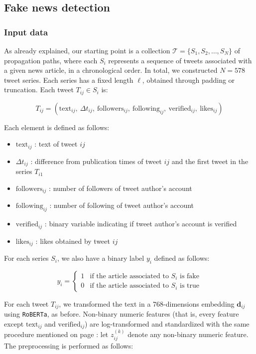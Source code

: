\documentclass[a4paper,twoside,12pt]{book}
\begin{document}
\subsection{Fake news detection} \label{fakenewsdata_detection_models}
\subsubsection*{Input data}

As already explained, our starting point is a collection $\mathcal{T} = \{ S_1, S_2, \dots, S_N \}$ of propagation paths, where each $S_i$ represents a sequence of tweets associated with a given news article, in a chronological order. In total, we constructed $N = 578$ tweet series. Each series has a fixed length $\ell$, obtained through padding or truncation.
Each tweet $T_{ij} \in S_i$ is: 

$$
T_{ij} = \left( \text{text}_{ij},\ \Delta t_{ij},\ \text{followers}_{ij},\ \text{following}_{ij},\ \text{verified}_{ij},\ \text{likes}_{ij} \right)
$$

Each element is defined as follows:
\begin{itemize}
	\item $\text{text}_{ij}$ : text of tweet $ij$
	\item $\Delta t_{ij}$ : difference from publication times of tweet $ij$ and the first tweet in the series $T_{i1}$
	\item $\text{followers}_{ij}$ : number of followers of tweet author's account
	\item $\text{following}_{ij}$ : number of following of tweet author's account
	\item $\text{verified}_{ij}$ : binary variable indicating if tweet author's account is verified
	\item $\text{likes}_{ij}$ : likes obtained by tweet $ij$
\end{itemize}

For each series $S_i$, we also have a binary label $y_i$ defined as follows:

$$
y_i =
\begin{cases}
	1 & \text{if the article associated to } S_i \text{ is fake} \\
	0 & \text{if the article associated to } S_i \text{ is true}
\end{cases}
$$

For each tweet $T_{ij}$, we transformed the text in a 768-dimensions embedding $\mathbf{d}_{ij}$ using \texttt{RoBERTa}, as before. Non-binary numeric features (that is, every feature except $\text{text}_{ij}$ and  $\text{verified}_{ij}$) are log-transformed and standardized with the same procedure mentioned on page \pageref{model 3}: let $z_{ij}^{(k)}$ denote any non-binary numeric feature. The preprocessing is performed as follows:
\end{document}

